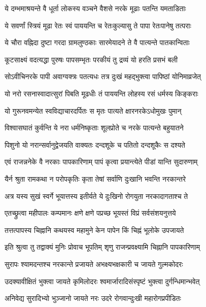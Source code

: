 \twolineshloka
{ये दम्भमाश्रयन्ते वै धूर्ता लोकस्य वञ्चने}
{वैशसे नरके मूढाः पतन्ति यमताडिताः}%

\twolineshloka
{ये सवर्णां स्त्रियं मूढा रेतः स्वं पाययन्ति च}
{रेतःकुल्यासु ते पापा रेतःपानेषु तत्पराः}%

\twolineshloka
{ये चौरा वह्निदा दुष्टा गरदा ग्रामलुण्ठकाः}
{सारमेयादने ते वै पात्यन्ते पातकान्विताः}%

\twolineshloka
{कूटसाक्ष्यं वदत्यद्धा पुरुषः पापसम्भृतः}
{परकीयं तु द्रव्यं यो हरति प्रसभं बली}%

\twolineshloka
{सोऽवीचिनरके पापी अवाग्वक्त्रः पतत्यधः}
{तत्र दुःखं महद्भुक्त्वा पापिष्ठां योनिमाव्रजेत्}%

\twolineshloka
{यो नरो रसनास्वादात्सुरां पिबति मूढधीः}
{तं पाययन्ति लोहस्य रसं धर्मस्य किङ्कराः}%

\twolineshloka
{यो गुरूनवमन्येत स्वविद्याचारदर्पितः}
{स मृतः पात्यते क्षारनरकेऽधोमुखः पुमान्}%

\twolineshloka
{विश्वासघातं कुर्वन्ति ये नरा धर्मनिष्कृताः}
{शूलप्रोते च नरके पात्यन्ते बहुयातने}%

\twolineshloka
{पिशुनो यो नरान्सर्वानुद्वेजयति वाक्यतः}
{दन्दशूके च पतितो दन्दशूकैः स दश्यते}%

\twolineshloka
{एवं राजन्ननेके वै नरकाः पापकारिणाम्}
{पापं कृत्वा प्रयान्त्येते पीडां यान्ति सुदारुणाम्}%

\twolineshloka
{यैर्न श्रुता रामकथा न परोपकृतिः कृता}
{तेषां सर्वाणि दुःखानि भवन्ति नरकान्तरे}%

\twolineshloka
{अत्र यस्य सुखं स्वर्गे भूयात्तस्य इतीर्यते}
{ये दुःखिनो रोगयुता नरकादागताश्च ते}%


\twolineshloka
{एतच्छ्रुत्वा महीपालः कम्पमानः क्षणे क्षणे}
{पप्रच्छ भूयस्तं विप्रं सर्वसंशयनुत्तये}%

\twolineshloka
{तत्तत्पापस्य चिह्नानि कथयस्व महामुने}
{केन पापेन किं चिह्नं भूलोके उपजायते}%

\twolineshloka
{इति श्रुत्वा तु तद्वाक्यं मुनिः प्रोवाच भूपतिम्}
{शृणु राजन्प्रवक्ष्यामि चिह्नानि पापकारिणाम्}%


\twolineshloka
{सुरापः श्यामदन्तश्च नरकान्ते प्रजायते}
{अभक्ष्यभक्षकारी च जायते गुल्मकोदरः}%

\twolineshloka
{उदक्यावीक्षितं भुक्त्वा जायते कृमिलोदरः}
{श्वमार्जारादिसंस्पृष्टं भुक्त्वा दुर्गन्धिमान्भवेत्}%

\twolineshloka
{अनिवेद्य सुरादिभ्यो भुञ्जानो जायते नरः}
{उदरे रोगवान्दुःखी महारोगप्रपीडितः}%

